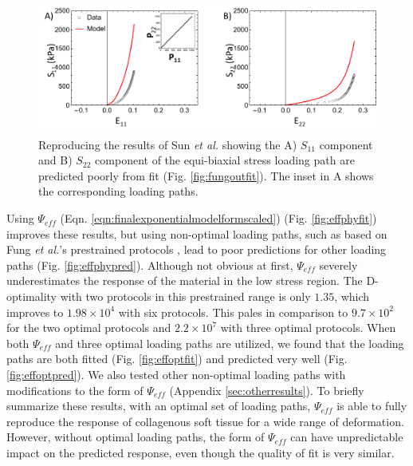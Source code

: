 \begin{figure}[hptb]
\centering
\includegraphics[width=\textwidth]{Images/chapter5/fungoutpred}
\caption{Reproducing the results of Sun \textit{et al.} \cite{sun_biaxial_2003} showing the A) $S_{11}$ component and B) $S_{22}$ component of the equi-biaxial stress loading path are predicted poorly from fit (Fig. \ref{fig:fungoutfit}). The inset in A shows the corresponding loading paths.}
\label{fig:fungoutpred}
\end{figure} 
    

	Using $\Psi_{eff}$ (Eqn. \ref{eqn:finalexponentialmodelformscaled}) (Fig. \ref{fig:effphyfit}) improves these results, but using non-optimal loading paths, such as based on Fung \textit{et al.}'s prestrained protocols \cite{fung_pseudoelasticity_1979}, lead to poor predictions for other loading paths (Fig. \ref{fig:effphypred}). Although not obvious at first, $\Psi_{eff}$ severely underestimates the response of the material in the low stress region. The D-optimality with two protocols in this prestrained range is only $1.35$, which improves to $1.98\times 10^4$ with six protocols. This pales in comparison to $9.7 \times 10^2$ for the two optimal protocols and $2.2 \times 10^7$ with three optimal protocols. When both $\Psi_{eff}$ and three optimal loading paths are utilized, we found that the loading paths are both fitted (Fig. \ref{fig:effoptfit}) and predicted very well (Fig. \ref{fig:effoptpred}). We also tested other non-optimal loading paths with modifications to the form of $\Psi_{eff}$ (Appendix \ref{sec:otherresults}). To briefly summarize these results, with an optimal set of loading paths, $\Psi_{eff}$ is able to fully reproduce the response of collagenous soft tissue for a wide range of deformation. However, without optimal loading paths, the form of $\Psi_{eff}$ can have unpredictable impact on the predicted response, even though the quality of fit is very similar. 


